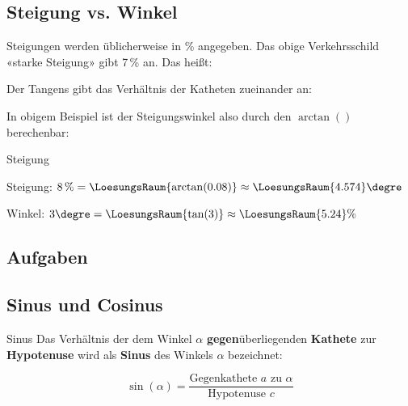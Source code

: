 \subsection{Steigung vs. Winkel}

Steigungen werden üblicherweise in \% angegeben. Das obige
Verkehrsschild «starke Steigung» gibt 7\,\% an. Das heißt:


Der Tangens gibt das Verhältnis der Katheten zueinander an:


In obigem Beispiel ist der Steigungswinkel also durch den $\arctan()$
berechenbar:

\newpage
\begin{beispiel}{Steigung}{}

  
  Steigung: $8\,\% = \LoesungsRaum{\arctan(0.08)} \approx \LoesungsRaum{4.574}\degre$

  Winkel: $3\degre = \LoesungsRaum{\tan(3)} \approx
  \LoesungsRaum{5.24}\%$

  
  \end{beispiel}


\subsection*{Aufgaben}


\newpage

\subsection{Sinus und Cosinus}

\begin{definition}{Sinus}{}
  Das Verhältnis der dem Winkel $\alpha$ \textbf{gegen}überliegenden \textbf{Kathete} zur \textbf{Hypotenuse}
  wird als \textbf{Sinus} des Winkels $\alpha$ bezeichnet:

  $$\sin(\alpha) = \frac{\text{Gegenkathete } a \text{ zu } \alpha}
  {\text{Hypotenuse } c}$$
\end{definition}

